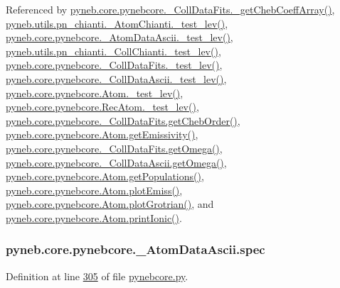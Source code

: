 Referenced by \hyperlink{pynebcore_8py_source_l00734}{pyneb.\+core.\+pynebcore.\+\_\+\+Coll\+Data\+Fits.\+\_\+get\+Cheb\+Coeff\+Array()}, \hyperlink{pn__chianti_8py_source_l00284}{pyneb.\+utils.\+pn\+\_\+chianti.\+\_\+\+Atom\+Chianti.\+\_\+test\+\_\+lev()}, \hyperlink{pynebcore_8py_source_l00435}{pyneb.\+core.\+pynebcore.\+\_\+\+Atom\+Data\+Ascii.\+\_\+test\+\_\+lev()}, \hyperlink{pn__chianti_8py_source_l00449}{pyneb.\+utils.\+pn\+\_\+chianti.\+\_\+\+Coll\+Chianti.\+\_\+test\+\_\+lev()}, \hyperlink{pynebcore_8py_source_l00660}{pyneb.\+core.\+pynebcore.\+\_\+\+Coll\+Data\+Fits.\+\_\+test\+\_\+lev()}, \hyperlink{pynebcore_8py_source_l01026}{pyneb.\+core.\+pynebcore.\+\_\+\+Coll\+Data\+Ascii.\+\_\+test\+\_\+lev()}, \hyperlink{pynebcore_8py_source_l01459}{pyneb.\+core.\+pynebcore.\+Atom.\+\_\+test\+\_\+lev()}, \hyperlink{pynebcore_8py_source_l02596}{pyneb.\+core.\+pynebcore.\+Rec\+Atom.\+\_\+test\+\_\+lev()}, \hyperlink{pynebcore_8py_source_l00694}{pyneb.\+core.\+pynebcore.\+\_\+\+Coll\+Data\+Fits.\+get\+Cheb\+Order()}, \hyperlink{pynebcore_8py_source_l01716}{pyneb.\+core.\+pynebcore.\+Atom.\+get\+Emissivity()}, \hyperlink{pynebcore_8py_source_l00811}{pyneb.\+core.\+pynebcore.\+\_\+\+Coll\+Data\+Fits.\+get\+Omega()}, \hyperlink{pynebcore_8py_source_l01063}{pyneb.\+core.\+pynebcore.\+\_\+\+Coll\+Data\+Ascii.\+get\+Omega()}, \hyperlink{pynebcore_8py_source_l01496}{pyneb.\+core.\+pynebcore.\+Atom.\+get\+Populations()}, \hyperlink{pynebcore_8py_source_l02313}{pyneb.\+core.\+pynebcore.\+Atom.\+plot\+Emiss()}, \hyperlink{pynebcore_8py_source_l02372}{pyneb.\+core.\+pynebcore.\+Atom.\+plot\+Grotrian()}, and \hyperlink{pynebcore_8py_source_l02167}{pyneb.\+core.\+pynebcore.\+Atom.\+print\+Ionic()}.

\hypertarget{classpyneb_1_1core_1_1pynebcore_1_1___atom_data_ascii_a6a8de35e7e1695c3dd670b46c776f45e}{}
\subsubsection[{spec}]{\setlength{\rightskip}{0pt plus 5cm}pyneb.\+core.\+pynebcore.\+\_\+\+Atom\+Data\+Ascii.\+spec}\label{classpyneb_1_1core_1_1pynebcore_1_1___atom_data_ascii_a6a8de35e7e1695c3dd670b46c776f45e}


Definition at line \hyperlink{pynebcore_8py_source_l00305}{305} of file \hyperlink{pynebcore_8py_source}{pynebcore.\+py}.



